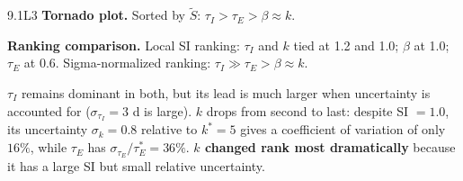 \begin{solution}{9.1}{L3}
 \textbf{Tornado plot.} Sorted by $\tilde{S}$: $\tau_I > \tau_E > \beta \approx k$.

 \textbf{Ranking comparison.}
Local SI ranking: $\tau_I$ and $k$ tied at 1.2 and 1.0; $\beta$ at 1.0; $\tau_E$ at 0.6.
Sigma-normalized ranking: $\tau_I \gg \tau_E > \beta \approx k$.

$\tau_I$ remains dominant in both, but its lead is much larger when
uncertainty is accounted for ($\sigma_{\tau_I} = 3$ d is large).
$k$ drops from second to last: despite SI $= 1.0$, its uncertainty
$\sigma_k = 0.8$ relative to $k^* = 5$ gives a coefficient of variation
of only $16\%$, while $\tau_E$ has $\sigma_{\tau_E}/\tau_E^* = 36\%$.
\textbf{$k$ changed rank most dramatically} because it has a large SI
but small relative uncertainty.


\end{solution}

